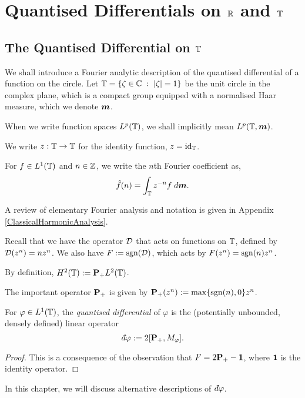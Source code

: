 
\chapter{Quantised Differentials on $\mathbb{R}$ and $\mathbb{T}$} %

\label{QuantisedDifferentialsOnRandT} %



\section{The Quantised Differential on $\mathbb{T}$}
We shall introduce a Fourier analytic description of the quantised differential
of a function on the circle. Let $\mathbb{T} = \{\zeta \in \mathbb{C}\;:\;|\zeta|=1\}$
be the unit circle in the complex plane, which is a compact group
equipped with a normalised Haar measure, which we denote $\boldsymbol{m}$.

When we write function spaces $L^p(\mathbb{T})$, we shall
implicitly mean $L^p(\mathbb{T},\boldsymbol{m})$.

We write $z:\mathbb{T}\to\mathbb{T}$ for the identity function, $z = \operatorname{id}_{\mathbb{T}}$.

For $f \in L^1(\mathbb{T})$ and $n \in \mathbb{Z}$, we write the $n$th Fourier coefficient as,
\begin{equation}
    \hat{f}(n) = \int_{\mathbb{T}} z^{-n}f\;d\boldsymbol{m}.
\end{equation}

A review of elementary Fourier analysis and
notation is given in Appendix \ref{ClassicalHarmonicAnalysis}.

Recall that we have the operator $\mathcal{D}$ that acts on functions on $\mathbb{T}$, defined
by $\mathcal{D}(z^n) = nz^n$. We also have $F := \operatorname{sgn}(\mathcal{D})$, which acts by $F(z^n) = \operatorname{sgn}(n)z^n$.

By definition, $H^2(\mathbb{T}) := \mathbf{P}_+L^2(\mathbb{T})$.

The important operator $\mathbf{P}_+$ is given by $\mathbf{P}_+(z^n) := \max\{\operatorname{sgn}(n),0\}z^n$.

\begin{proposition}
    For $\varphi \in L^1(\mathbb{T})$, the \emph{quantised differential} of $\varphi$ is the (potentially unbounded, densely defined) linear operator
    \begin{equation}
        \qd\varphi := 2[\Proj_+,M_\varphi].
    \end{equation}
\end{proposition}
\begin{proof}
    This is a consequence of the observation that $F = 2\mathbf{P}_+-\mathbf{1}$,
    where $\mathbf{1}$ is the identity operator.
\end{proof}
In this chapter, we will discuss alternative descriptions of $\qd \varphi$.

